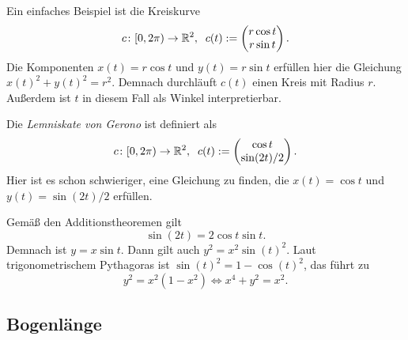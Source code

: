 Ein einfaches Beispiel ist die Kreiskurve
\begin{equation}
c\colon{[0,2\pi)}\to\mathbb R^2,\;\;c(t):=\begin{pmatrix}
r\cos t\\
r\sin t
\end{pmatrix}.
\end{equation}
Die Komponenten $x(t)=r\cos t$  und $y(t)=r\sin t$ erfüllen hier die
Gleichung $x(t)^2+y(t)^2=r^2$. Demnach durchläuft $c(t)$ einen
Kreis mit Radius $r$. Außerdem ist $t$ in diesem Fall als Winkel
interpretierbar.

Die \emph{Lemniskate von Gerono} ist definiert als
\begin{equation}
c\colon{[0,2\pi)}\to\mathbb R^2,\;\;c(t):=\begin{pmatrix}
\cos t\\
\sin(2t)/2
\end{pmatrix}.
\end{equation}
Hier ist es schon schwieriger, eine Gleichung zu finden, die
$x(t)=\cos t$ und $y(t)=\sin(2t)/2$ erfüllen.

Gemäß den Additionstheoremen gilt
\begin{equation}
\sin(2t) = 2\cos t\sin t.
\end{equation}
Demnach ist $y=x\sin t$. Dann gilt auch $y^2=x^2\sin(t)^2$.
Laut trigonometrischem Pythagoras ist $\sin(t)^2=1-\cos(t)^2$,
das führt zu
\begin{equation}\label{eq:Gerono-implizit}
y^2=x^2(1-x^2)\iff x^4+y^2 = x^2.
\end{equation}


\subsection{Bogenlänge}

